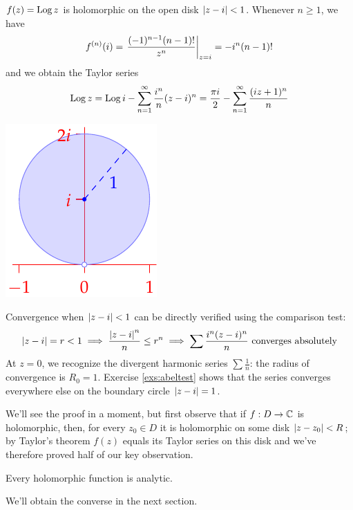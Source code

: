 \begin{examples}{}{}
\begin{enumerate}
  \begin{minipage}[t]{0.7\linewidth}\vspace{0pt}
		\item $f(z)=\operatorname{Log} z$ is holomorphic on the open disk $\left| z-i\right|<1$.\smallbreak
		Whenever $n\ge 1$, we have
		\[f^{(n)}(i)=\left.\frac{(-1)^{n-1}(n-1)!}{z^{n}}\right|_{z=i}=-i^n(n-1)!\]
		and we obtain the Taylor series
  	\[\operatorname{Log} z=\operatorname{Log} i-\sum_{n=1}^\infty \frac{i^n}{n}(z-i)^n =\frac{\pi i}2-\sum_{n=1}^\infty \frac{(iz+1)^n}n\]
  \end{minipage}\begin{minipage}[t]{0.3\linewidth}\vspace{0pt}
  \flushright\includegraphics{taylorex2}
  \end{minipage}\medbreak
  
	Convergence when $\left| z-i\right|<1$ can be directly verified using the comparison test:
	\[\left| z-i\right|=r<1\implies\frac{\left| z-i\right|^n}n\le r^n\implies \sum\frac{i^n(z-i)^n}n\text{ converges absolutely}\]
	At $z=0$, we recognize the divergent harmonic series $\sum \frac 1n$: the radius of convergence is $R_0=1$. Exercise \ref{exs:abeltest} shows that the series converges everywhere else on the boundary circle $\left| z-i\right|=1$.
  \end{enumerate}
\end{examples}

We'll see the proof in a moment, but first observe that if $f:D\to\mathbb{C}$ is holomorphic, then, for every $z_0\in D$ it is holomorphic on some disk $\left| z-z_0\right|<R$; by Taylor's theorem $f(z)$ equals its Taylor series on this disk and we've therefore proved half of our key observation.

\begin{cor}{}{}
Every holomorphic function is analytic.
\end{cor}

We'll obtain the converse in the next section.
\goodbreak

